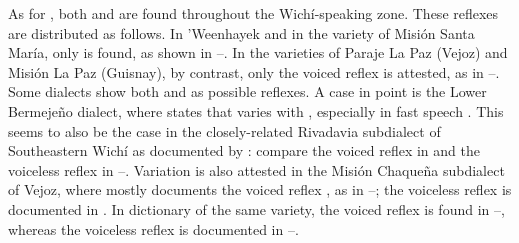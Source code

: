As for , both  and  are found throughout the Wichí-speaking zone. These reflexes are distributed as follows. In ’Weenhayek and in the variety of Misión Santa María, only  is found, as shown in –. In the varieties of Paraje La Paz (Vejoz) and Misión La Paz (Guisnay), by contrast, only the voiced reflex is attested, as in –. Some dialects show both  and  as possible reflexes. A case in point is the Lower Bermejeño dialect, where \citet[52]{VN14} states that  varies with , especially in fast speech . This seems to also be the case in the closely-related Rivadavia subdialect of Southeastern Wichí as documented by \citet{JT09-th}: compare the voiced reflex in  and the voiceless reflex in –. Variation is also attested in the Misión Chaqueña subdialect of Vejoz, where \citet{VU74} mostly documents the voiced reflex , as in –; the voiceless reflex is documented in . In  dictionary of the same variety, the voiced reflex is found in –, whereas the voiceless reflex is documented in –.

